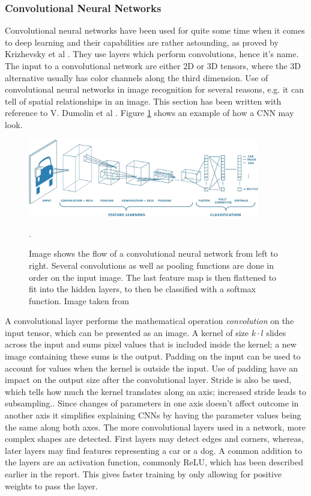  \subsubsection{Convolutional Neural Networks}

 Convolutional neural networks have been used for quite some time when it comes to deep learning and their capabilities are rather astounding, as proved by Krizhevsky et al \cite{NIPS2012_4824}.  They use layers which perform convolutions, hence it's name.  The input to a convolutional network are either 2D or 3D tensors, where the 3D alternative usually has color channels along the third dimension. Use of convolutional neural networks in image recognition for several reasons, e.g. it can tell of spatial relationships in an image. This section has been written with reference to V. Dumolin et al \cite{convArit}. Figure \ref{fig:cnn} shows an example of how a CNN may look.
 
 \begin{figure}[hbtp]
\begin{center}
\includegraphics[width = 0.9\textwidth]{./Images/convNetwork.jpg}
\caption{Image shows the flow of a convolutional neural network from left to right. Several convolutions as well as pooling functions are done in order on the input image. The last feature map is then flattened to fit into the hidden layers, to then be classified with a softmax function. Image taken from \cite{cnnImage}}.
\label{fig:cnn}
\end{center}
\end{figure}
 
 A convolutional layer performs the mathematical operation \textit{convolution} on the input tensor, which can be presented as an image. A kernel of size $k \cdot l$ slides across the input and sums pixel values that is included inside the kernel; a new image containing these sums is the output. Padding on the input can be used to account for values when the kernel is outside the input. Use of padding have an impact on the output size after the convolutional layer. Stride is also be used, which tells how much the kernel translates along an axis;  increased stride leads to subsampling.. Since changes of parameters in one axis doesn't affect outcome in another axis it simplifies explaining CNNs by having the parameter values being the same along both axes. The more convolutional layers used in a network, more complex shapes are detected. First layers may detect edges and corners, whereas, later layers may find features representing a car or a dog. A common addition to the layers are an activation function, commonly ReLU, which has been described earlier in the report. This gives faster training by only allowing for positive weights to pass the layer.

